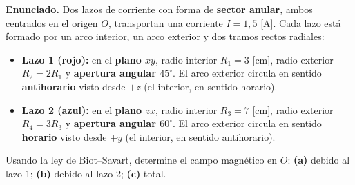 \documentclass[12pt,letterpaper]{article}
\begin{document}
\noindent
\begin{minipage}[t]{0.50\textwidth}
\vspace{0pt}
\noindent\textbf{Enunciado.} Dos lazos de corriente con forma de \textbf{sector anular}, ambos
centrados en el origen $O$, transportan una corriente $I = 1{,}5$ [A]. Cada lazo est\'a formado
por un arco interior, un arco exterior y dos tramos rectos radiales:
\begin{itemize}\setlength\itemsep{2pt}
    \item \textbf{Lazo 1 (rojo):} en el \textbf{plano $xy$}, radio interior $R_1 = 3$ [cm], radio
          exterior $R_2 = 2R_1$ y \textbf{apertura angular $45^\circ$}. El arco exterior circula en
          sentido \textbf{antihorario} visto desde $+z$ (el interior, en sentido horario).
    \item \textbf{Lazo 2 (azul):} en el \textbf{plano $zx$}, radio interior $R_3 = 7$ [cm], radio
          exterior $R_4 = 3R_3$ y \textbf{apertura angular $60^\circ$}. El arco exterior circula
          en sentido \textbf{horario} visto desde $+y$ (el interior, en sentido antihorario).
\end{itemize}
Usando la ley de Biot--Savart, determine el campo magn\'etico en $O$:
\textbf{(a)} debido al lazo 1; \textbf{(b)} debido al lazo 2; \textbf{(c)} total.
\end{minipage}%
\hfill
\end{document}
